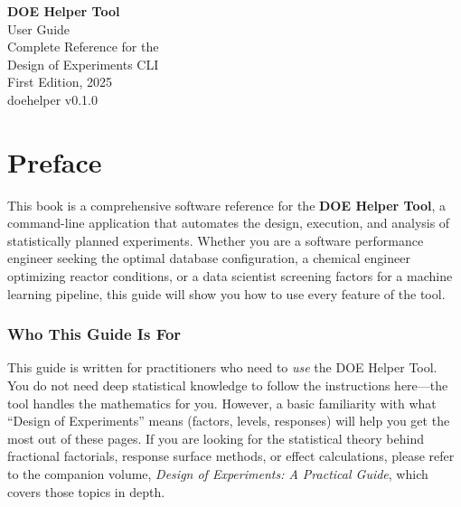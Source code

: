 \documentclass[11pt]{book}
\begin{document}
\begin{titlepage}
\begin{center}
\vspace*{2cm}

{\Huge\sffamily\bfseries\color{darkblue} DOE Helper Tool}\\[0.5cm]
{\LARGE\sffamily\color{steelblue} User Guide}\\[1.5cm]
{\large\sffamily Complete Reference for the\\Design of Experiments CLI}\\[3cm]
{\large First Edition, 2025}\\[2cm]

\vfill
{\small\textsf{doehelper v0.1.0}}
\end{center}
\end{titlepage}

\frontmatter
\tableofcontents

\chapter*{Preface}

This book is a comprehensive software reference for the \textbf{DOE Helper Tool}, a command-line application that automates the design, execution, and analysis of statistically planned experiments. Whether you are a software performance engineer seeking the optimal database configuration, a chemical engineer optimizing reactor conditions, or a data scientist screening factors for a machine learning pipeline, this guide will show you how to use every feature of the tool.

\subsection*{Who This Guide Is For}

This guide is written for practitioners who need to \emph{use} the DOE Helper Tool. You do not need deep statistical knowledge to follow the instructions here---the tool handles the mathematics for you. However, a basic familiarity with what ``Design of Experiments'' means (factors, levels, responses) will help you get the most out of these pages. If you are looking for the statistical theory behind fractional factorials, response surface methods, or effect calculations, please refer to the companion volume, \emph{Design of Experiments: A Practical Guide}, which covers those topics in depth.
\end{document}
